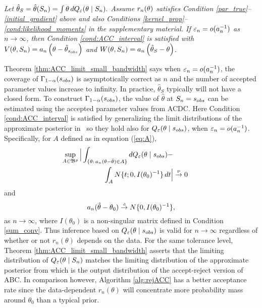 	
\begin{thm} \label{thm:ACC_limit_small_bandwidth}
{\it Let $\hat{\theta}_{S} = \hat{\theta}(S_n) =  \int \btheta  \, d Q_{\veps}(\theta\mid S_n).$ Assume $r_{n}(\btheta)$ satisfies Condition \ref{par_true}--\ref{initial_gradient} above and also  Conditions \ref{kernel_prop}--\ref{cond:likelihood_moments} in the supplementary material. If $\veps_{n}=o(a_{n}^{-1})$ 
as $n\rightarrow\infty$, then Condition \ref{cond:ACC_interval} is satisfied with $V(\btheta,S_n)=a_{n}\left(\btheta-\hat{\theta}_{s_{obs}}\right)$ and $W(\btheta,S_{n})=a_{n}\left(\hat{\theta}_{S}-\btheta\right)$.}
\end{thm}
	
Theorem \ref{thm:ACC_limit_small_bandwidth} says when $\veps_{n}=o(a_{n}^{-1})$, the coverage of $\Gamma_{1-\alpha}(s_{\rm obs})$ is asymptotically correct as $n$ and the number of accepted parameter values increase to infinity. In practice, $\hat{\theta}_{S}$ typically will not have a closed form. To construct $\Gamma_{1-\alpha}(s_{\rm obs})$, the value of $\hat{\theta}$ at $S_n=s_{\rm obs}$ can be estimated using the accepted parameter values from ACDC.
Here Condition \ref{cond:ACC_interval} is satisfied by generalizing the limit distributions of the approximate posterior %
in~\cite{Li2017} so they hold also for $Q_{\veps}(\theta\mid s_{obs})$, when $\veps_n=o(a_n^{-1})$. Specifically, for $A$ defined as in equation (\ref{eq:A}),
\begin{eqnarray}
&\sup_{A\in\mathfrak{B}^{p}}\Big| \int_{\{\btheta: \, a_{n}(\btheta-\hat{\theta})\in A\}} d Q_{\veps}(\btheta \mid   \bs_{{\rm obs}})-\qquad \qquad \notag \\
&\qquad \qquad \qquad \int_{A}N\{t;0,I(\btheta_{0})^{-1}\}\,dt \Big| \stackrel{\hbox{\tiny P}} \rightarrow 0 
\end{eqnarray}\label{thm2_uncertainty}
and 
\begin{equation}
a_{n}(\hat{\theta}-\btheta_{0}) \stackrel{\hbox{\tiny d}} \rightarrow N\{0,I(\btheta_{0})^{-1}\}, \label{thm2_ptestimate}
\end{equation}
as $n\rightarrow\infty$, where $I(\theta_0)$ is a non-singular matrix defined in Condition \ref{sum_conv}. Thus inference based on $Q_{\veps}(\theta \mid s_{obs})$ is valid for $n \rightarrow \infty$ regardless of whether or not $r_{n}(\theta)$ depends on the data. For the same tolerance level, Theorem \ref{thm:ACC_limit_small_bandwidth} asserts that the limiting distribution of $Q_{\veps}(\theta \mid S_n)$ matches the limiting distribution of the approximate posterior from \cite{Li2017} which is the output distribution of the accept-reject version of ABC. %
In comparison however, Algorithm \ref{alg:rejACC} has a better acceptance rate since the data-dependent $r_{n}(\theta)$ will concentrate more probability mass around $\theta_0$ than a typical prior. %



